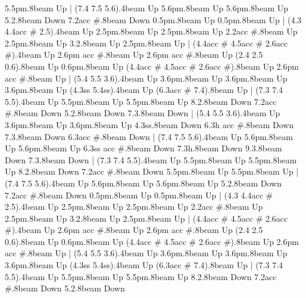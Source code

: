       5.5{pm}.8{beam Up}
    |
      (7.4 7.5 5.6).4{beam Up}
      5.6{pm}.8{beam Up}
      5.6{pm}.8{beam Up}
      5.2.8{beam Down}
      7.2{acc #}.8{beam Down}
      0.5{pm}.8{beam Up}
      0.5{pm}.8{beam Up}
    |
      (4.3 4.4{acc #} 2.5).4{beam Up}
      2.5{pm}.8{beam Up}
      2.5{pm}.8{beam Up}
      2.2{acc #}.8{beam Up}
      2.5{pm}.8{beam Up}
      3.2.8{beam Up}
      2.5{pm}.8{beam Up}
    |
      (4.4{acc #} 4.5{acc #} 2.6{acc #}).4{beam Up}
      2.6{pm acc #}.8{beam Up}
      2.6{pm acc #}.8{beam Up}
      (2.4 2.5 0.6).8{beam Up}
      0.6{pm}.8{beam Up}
      (4.4{acc #} 4.5{acc #} 2.6{acc #}).8{beam Up}
      2.6{pm acc #}.8{beam Up}
    |
      (5.4 5.5 3.6).4{beam Up}
      3.6{pm}.8{beam Up}
      3.6{pm}.8{beam Up}
      3.6{pm}.8{beam Up}
      (4.3{ss} 5.4{ss}).4{beam Up}
      (6.3{acc #} 7.4).8{beam Up}
    |
      (7.3 7.4 5.5).4{beam Up}
      5.5{pm}.8{beam Up}
      5.5{pm}.8{beam Up}
      8.2.8{beam Down}
      7.2{acc #}.8{beam Down}
      5.2.8{beam Down}
      7.3.8{beam Down}
    |
      (5.4 5.5 3.6).4{beam Up}
      3.6{pm}.8{beam Up}
      3.6{pm}.8{beam Up}
      4.3{ss}.8{beam Down}
      6.3{h acc #}.8{beam Down}
      7.3.8{beam Down}
      6.3{acc #}.8{beam Down}
    |
      (7.4 7.5 5.6).4{beam Up}
      5.6{pm}.8{beam Up}
      5.6{pm}.8{beam Up}
      6.3{ss acc #}.8{beam Down}
      7.3{h}.8{beam Down}
      9.3.8{beam Down}
      7.3.8{beam Down}
    |
      (7.3 7.4 5.5).4{beam Up}
      5.5{pm}.8{beam Up}
      5.5{pm}.8{beam Up}
      8.2.8{beam Down}
      7.2{acc #}.8{beam Down}
      5.5{pm}.8{beam Up}
      5.5{pm}.8{beam Up}
    |
      (7.4 7.5 5.6).4{beam Up}
      5.6{pm}.8{beam Up}
      5.6{pm}.8{beam Up}
      5.2.8{beam Down}
      7.2{acc #}.8{beam Down}
      0.5{pm}.8{beam Up}
      0.5{pm}.8{beam Up}
    |
      (4.3 4.4{acc #} 2.5).4{beam Up}
      2.5{pm}.8{beam Up}
      2.5{pm}.8{beam Up}
      2.2{acc #}.8{beam Up}
      2.5{pm}.8{beam Up}
      3.2.8{beam Up}
      2.5{pm}.8{beam Up}
    |
      (4.4{acc #} 4.5{acc #} 2.6{acc #}).4{beam Up}
      2.6{pm acc #}.8{beam Up}
      2.6{pm acc #}.8{beam Up}
      (2.4 2.5 0.6).8{beam Up}
      0.6{pm}.8{beam Up}
      (4.4{acc #} 4.5{acc #} 2.6{acc #}).8{beam Up}
      2.6{pm acc #}.8{beam Up}
    |
      (5.4 5.5 3.6).4{beam Up}
      3.6{pm}.8{beam Up}
      3.6{pm}.8{beam Up}
      3.6{pm}.8{beam Up}
      (4.3{ss} 5.4{ss}).4{beam Up}
      (6.3{acc #} 7.4).8{beam Up}
    |
      (7.3 7.4 5.5).4{beam Up}
      5.5{pm}.8{beam Up}
      5.5{pm}.8{beam Up}
      8.2.8{beam Down}
      7.2{acc #}.8{beam Down}
      5.2.8{beam Down}
